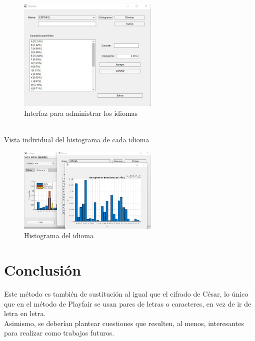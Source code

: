 \documentclass[10pt]{article}
\begin{document}
\begin{figure}[!ht]
  \centering
  \includegraphics[width=0.6\textwidth]{GUI_3}
  \caption{Interfaz para administrar los idiomas}
  \label{fig_sim}
\end{figure}
\\
Vista individual del histograma de cada idioma
\begin{figure}[!ht]
  \centering
  \includegraphics[width=0.6\textwidth]{GUI_4}
  \caption{Histograma del idioma}
  \label{fig_sim}
\end{figure}

\newpage

\par\vspace{\baselineskip}

\section{Conclusión}
\justify
Este método es también de sustitución al igual que el cifrado de César, lo único que en el método de Playfair se
usan pares de letras o caracteres, en vez de ir de letra en letra.\\
Asimismo, se deberían plantear cuestiones que resulten, al menos, interesantes para
realizar como trabajos futuros.

 
 

\par\vspace{\baselineskip}
\end{document}
